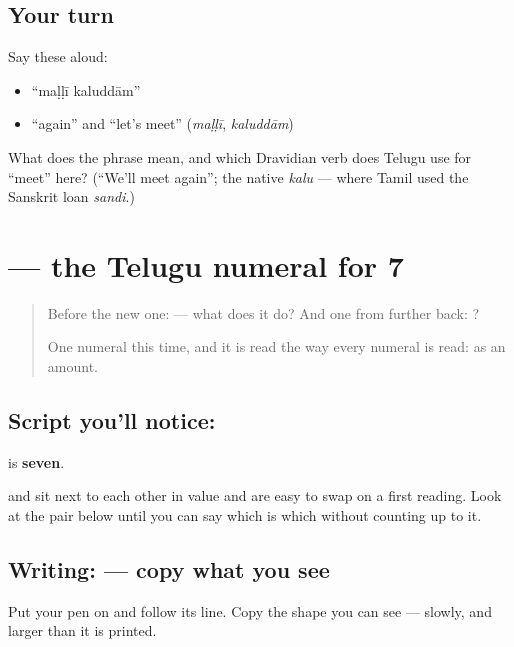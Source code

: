 \subsection*{Your turn}
Say these aloud:

\begin{itemize}
\raggedright
  \item \textquotedblleft{}maḷḷī kaluddām\textquotedblright{}
  \item \textquotedblleft{}again\textquotedblright{} and \textquotedblleft{}let's meet\textquotedblright{} (\emph{maḷḷī}, \emph{kaluddām})
\end{itemize}

\begin{tcolorbox}[breakable,colback=teal!4,colframe=teal!35!black,title={Before you move on}]
What does the phrase mean, and which Dravidian verb does Telugu use for \textquotedblleft{}meet\textquotedblright{} here? (\textquotedblleft{}We'll meet again\textquotedblright{}; the native \emph{kalu} — where Tamil used the Sanskrit loan \emph{sandi}.)
\end{tcolorbox}
\section[\texorpdfstring{\te{౭} (7)}{౭ (7)}]{ — the Telugu numeral for 7}

\label{lesson:TE-S146-digit-7}



\begin{quote}
Before the new one:  — what does it do? And one from further back: ?

One numeral this time, and it is read the way every numeral is read: as an amount.
\end{quote}

\subsection*{Script you'll notice: }
\textbf{} is \textbf{seven}.

\textbf{} and \textbf{} sit next to each other in value and are easy to swap on a first reading. Look at the pair below until you can say which is which without counting up to it.

\subsection*{Writing:  — copy what you see}
Put your pen on  and follow its line. Copy the shape you can see — slowly, and larger than it is printed.

